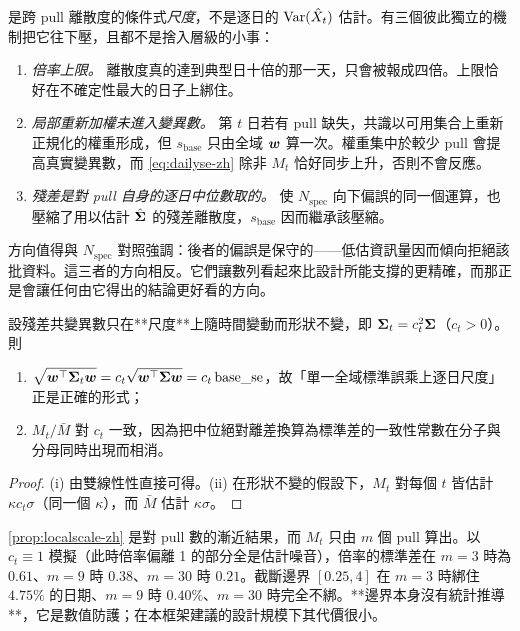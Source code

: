 \documentclass[12pt,a4paper,oneside]{article}
\begin{document}
\begin{remark}
 是跨 pull 離散度的條件式\emph{尺度}，不是逐日的 $\operatorname{Var}(\hat{X}_t)$ 估計。有三個彼此獨立的機制把它往下壓，且都不是捨入層級的小事：

\begin{enumerate}
\item \emph{倍率上限。} 離散度真的達到典型日十倍的那一天，只會被報成四倍。上限恰好在不確定性最大的日子上綁住。

\item \emph{局部重新加權未進入變異數。} 第 $t$ 日若有 pull 缺失，共識以可用集合上重新正規化的權重形成，但 $s_{\text{base}}$ 只由全域 $\bm{w}$ 算一次。權重集中於較少 pull 會提高真實變異數，而 \eqref{eq:dailyse-zh} 除非 $M_t$ 恰好同步上升，否則不會反應。

\item \emph{殘差是對 pull 自身的逐日中位數取的。} 使 $N_{\text{spec}}$ 向下偏誤的同一個運算，也壓縮了用以估計 $\hat{\bm{\Sigma}}$ 的殘差離散度，$s_{\text{base}}$ 因而繼承該壓縮。
\end{enumerate}

方向值得與 $N_{\text{spec}}$ 對照強調：後者的偏誤是保守的——低估資訊量因而傾向拒絕該批資料。這三者的方向相反。它們讓數列看起來比設計所能支撐的更精確，而那正是會讓任何由它得出的結論更好看的方向。
\end{remark}

\begin{proposition}[區域倍率估計的是什麼]\label{prop:localscale-zh}
設殘差共變異數只在**尺度**上隨時間變動而形狀不變，即 $\bm{\Sigma}_t=c_t^2\bm{\Sigma}$（$c_t>0$）。則
\begin{enumerate}
\item $\sqrt{\bm{w}^{\top}\bm{\Sigma}_t\bm{w}}=c_t\sqrt{\bm{w}^{\top}\bm{\Sigma}\bm{w}}=c_t\,\text{base\_se}$，故「單一全域標準誤乘上逐日尺度」正是正確的形式；
\item $M_t/\bar{M}$ 對 $c_t$ 一致，因為把中位絕對離差換算為標準差的一致性常數在分子與分母同時出現而相消。
\end{enumerate}
\end{proposition}

\begin{proof}
(i) 由雙線性性直接可得。(ii) 在形狀不變的假設下，$M_t$ 對每個 $t$ 皆估計 $\kappa c_t\sigma$（同一個 $\kappa$），而 $\bar{M}$ 估計 $\kappa\sigma$。
\end{proof}

\begin{remark}
\cref{prop:localscale-zh} 是對 pull 數的漸近結果，而 $M_t$ 只由 $m$ 個 pull 算出。以 $c_t\equiv1$ 模擬（此時倍率偏離 1 的部分全是估計噪音），倍率的標準差在 $m=3$ 時為 $0.61$、$m=9$ 時 $0.38$、$m=30$ 時 $0.21$。截斷邊界 $[0.25,4]$ 在 $m=3$ 時綁住 $4.75\%$ 的日期、$m=9$ 時 $0.40\%$、$m=30$ 時完全不綁。**邊界本身沒有統計推導**，它是數值防護；在本框架建議的設計規模下其代價很小。
\end{remark}
\end{document}
